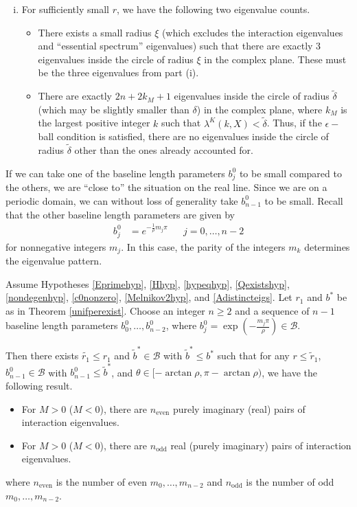 \documentclass[thesis.tex]{subfiles}
\begin{document}
\begin{theorem}
\begin{enumerate}[(i)]
\item For sufficiently small $r$, we have the following two eigenvalue counts.
\begin{itemize}
	\item There exists a small radius $\xi$ (which excludes the interaction eigenvalues and ``essential spectrum'' eigenvalues) such that there are exactly 3 eigenvalues inside the circle of radius $\xi$ in the complex plane. These must be the three eigenvalues from part (i).

	\item There are exactly $2n + 2 k_M + 1$ eigenvalues inside the circle of radius $\tilde{\delta}$ (which may be slightly smaller than $\delta$) in the complex plane, where $k_M$ is the largest positive integer $k$ such that $\lambda^K(k,X) < \tilde{\delta}$. Thus, if the $\epsilon-$ball condition is satisfied, there are no eigenvalues inside the circle of radius $\tilde{\delta}$ other than the ones already accounted for.
\end{itemize}
\end{enumerate}
\end{theorem}

If we can take one of the baseline length parameters $b_j^0$ to be small compared to the others, we are ``close to'' the situation on the real line. Since we are on a periodic domain, we can without loss of generality take $b_{n-1}^0$ to be small. Recall that the other baseline length parameters are given by
\begin{align*}
b_j^0 &= e^{-\frac{1}{\rho}m_j \pi} && j = 0, \dots, n-2
\end{align*}
for nonnegative integers $m_j$. In this case, the parity of the  integers $m_k$ determines the eigenvalue pattern.

\begin{theorem}\label{inteigsparity}
Assume Hypotheses \ref{Eprimehyp}, \ref{Hhyp}, \ref{hypeqhyp}, \ref{Qexistshyp}, \ref{nondegenhyp}, \ref{c0nonzero}, \ref{Melnikov2hyp}, and \ref{Adistincteigs}. Let $r_1$ and $b^*$ be as in Theorem \ref{unifperexist}. Choose an integer $n \geq 2$ and a sequence of $n-1$ baseline length parameters $b_0^0, \dots, b_{n-2}^0$, where $b_j^0 = \exp\left(-\frac{m_j \pi}{\rho}\right) \in \mathcal{B}$. 

Then there exists $\tilde{r_1} \leq r_1$ and $\tilde{b}^* \in \mathcal{B}$ with $\tilde{b}^* \leq b^*$ such that for any $r \leq \tilde{r}_1$, $b_{n-1}^0 \in \mathcal{B}$ with $b_{n-1}^0 \leq \tilde{b}^*$, and $\theta \in [-\arctan \rho, \pi - \arctan \rho)$, we have the following result.
\begin{itemize}
\item For $M > 0$ ($M < 0$), there are $n_{\text{even}}$ purely imaginary (real) pairs of interaction eigenvalues.
\item For $M > 0$ ($M < 0$), there are $n_{\text{odd}}$ real (purely imaginary) pairs of interaction eigenvalues.
\end{itemize}
where $n_{\text{even}}$ is the number of even $m_0, \dots, m_{n-2}$ and $n_{\text{odd}}$ is the number of odd $m_0, \dots, m_{n-2}$.
\end{theorem}
\end{document}
